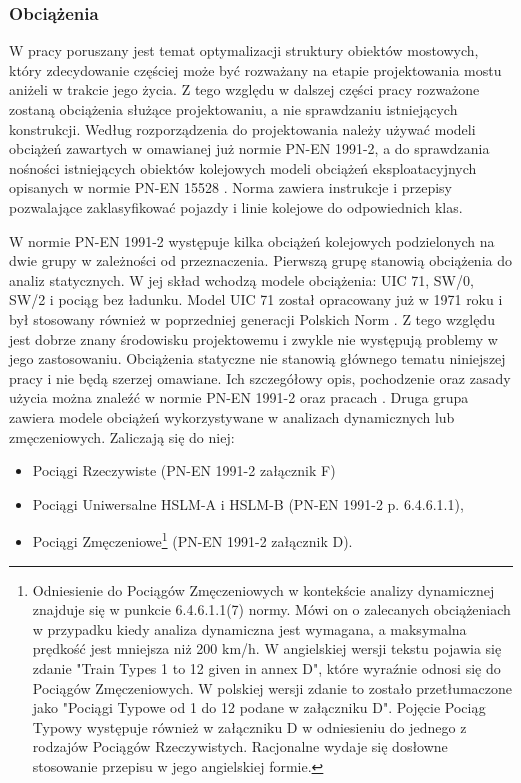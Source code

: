 \subsubsection{Obciążenia} \label{sect: eurokod_obciazenia_dyn}
W pracy poruszany jest temat optymalizacji struktury obiektów mostowych, który zdecydowanie częściej może być rozważany na etapie projektowania mostu aniżeli w trakcie jego życia. Z tego względu w dalszej części pracy rozważone zostaną obciążenia służące projektowaniu, a nie sprawdzaniu istniejących konstrukcji. Według rozporządzenia \parencite{PolskiKomitetNormalizacyjny} do projektowania należy używać modeli obciążeń zawartych w omawianej już normie PN-EN 1991-2, a do sprawdzania nośności istniejących obiektów kolejowych modeli obciążeń eksploatacyjnych opisanych w normie PN-EN 15528 \parencite{PolskiKomitetNormalizacyjnya,uszczki2015}. Norma \cite{PolskiKomitetNormalizacyjnya} zawiera instrukcje i przepisy pozwalające zaklasyfikować pojazdy i linie kolejowe do odpowiednich klas.

W normie PN-EN 1991-2 występuje kilka obciążeń kolejowych podzielonych na dwie grupy w zależności od przeznaczenia. Pierwszą grupę stanowią obciążenia do analiz statycznych. W jej skład wchodzą modele obciążenia: UIC 71, SW/0, SW/2 i pociąg bez ładunku. Model UIC 71 został opracowany już w 1971 roku \parencite{UnionInternationaleDesCheminsDeFer2006} i był stosowany również w poprzedniej generacji Polskich Norm \parencite{PKNe}. Z tego względu jest dobrze znany środowisku projektowemu i zwykle nie występują problemy w jego zastosowaniu. Obciążenia statyczne nie stanowią głównego tematu niniejszej pracy i nie będą szerzej omawiane. Ich szczegółowy opis, pochodzenie oraz zasady użycia można znaleźć w normie PN-EN 1991-2 oraz pracach \parencite{James2003,UnionInternationaleDesCheminsDeFer2006}. Druga grupa zawiera modele obciążeń wykorzystywane w analizach dynamicznych lub zmęczeniowych. Zaliczają się do niej:
\begin{itemize}
	\item Pociągi Rzeczywiste (PN-EN 1991-2 załącznik F)
	\item Pociągi Uniwersalne HSLM-A i HSLM-B (PN-EN 1991-2 p. 6.4.6.1.1),
	\item Pociągi Zmęczeniowe\footnote{
		Odniesienie do Pociągów Zmęczeniowych w kontekście analizy dynamicznej znajduje się w punkcie 6.4.6.1.1(7) normy. Mówi on o zalecanych obciążeniach w przypadku kiedy analiza dynamiczna jest wymagana, a maksymalna prędkość jest mniejsza niż 200 km/h. W angielskiej wersji tekstu pojawia się zdanie "Train Types 1 to 12 given in annex D", które wyraźnie odnosi się do Pociągów Zmęczeniowych. W polskiej wersji zdanie to zostało przetłumaczone jako "Pociągi Typowe od 1 do 12 podane w załączniku D". Pojęcie Pociąg Typowy występuje również w załączniku D w odniesieniu do jednego z rodzajów Pociągów Rzeczywistych. Racjonalne wydaje się dosłowne stosowanie przepisu w jego angielskiej formie.} 
	(PN-EN 1991-2 załącznik D). 
\end{itemize}

